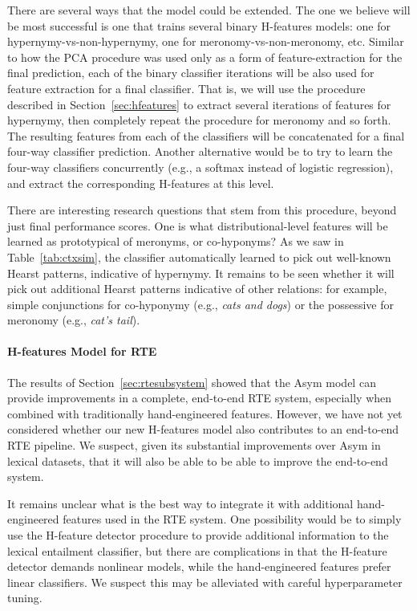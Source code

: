 \documentclass[12pt]{article}
\begin{document}
There are several ways that the model could be extended. The one we believe
will be most successful is one that trains several binary H-features models:
one for hypernymy-vs-non-hypernymy, one for meronomy-vs-non-meronomy, etc.
Similar to how the PCA procedure was used only as a form of feature-extraction
for the final prediction, each of the binary classifier iterations will be also
used for feature extraction for a final classifier.
That is, we will use the procedure described in Section~\ref{sec:hfeatures}
to extract several iterations of features for hypernymy, then completely repeat
the procedure for meronomy and so forth. The resulting features from each
of the classifiers will be concatenated for a final four-way classifier prediction.
Another alternative would be to try to learn the four-way classifiers concurrently
(e.g., a softmax instead of logistic regression), and extract the corresponding
H-features at this level.

There are interesting research questions that stem from this procedure, beyond
just final performance scores. One is what distributional-level features will
be learned as prototypical of meronyms, or co-hyponyms? As we saw in
Table~\ref{tab:ctxsim}, the classifier automatically learned to pick
out well-known Hearst patterns, indicative of hypernymy. It remains to be seen
whether it will pick out additional Hearst patterns indicative of other
relations: for example, simple conjunctions for co-hyponymy (e.g., {\em cats
and dogs}) or the possessive for meronomy (e.g., {\em cat's tail}).

\paragraph{H-features Model for RTE}

The results of Section~\ref{sec:rtesubsystem} showed that the Asym
model can provide improvements in a complete, end-to-end RTE
system, especially when combined with traditionally hand-engineered features.
However, we have not yet considered whether our new H-features model also
contributes to an end-to-end RTE pipeline.
We suspect, given its substantial improvements over Asym in lexical datasets,
that it will also be able to be able to improve the end-to-end system.

It remains unclear what is the best way to integrate it with
additional hand-engineered features used in the RTE system. One possibility
would be to simply use the H-feature detector procedure to provide additional
information to the lexical entailment classifier, but there are complications
in that the H-feature detector demands nonlinear models, while the
hand-engineered features prefer linear classifiers. We suspect this
may be alleviated with careful hyperparameter tuning.
\end{document}
